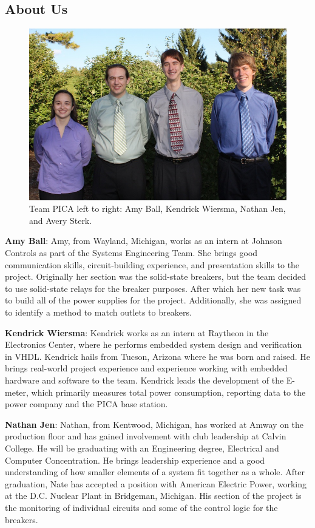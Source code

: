 \subsection{About Us}
\begin{figure}[htbp]
  \centering
  \includegraphics[width=6in]{includes/IMG_0865}
  \caption{Team PICA left to right: Amy Ball, Kendrick Wiersma, Nathan Jen, and Avery Sterk.}
  \label{fig:team_picture}
\end{figure}
\textbf{Amy Ball}: Amy, from Wayland, Michigan, works as an intern at Johnson Controls as part of the Systems Engineering Team. She brings good communication skills, circuit-building experience, and presentation skills to the project. Originally her section was the solid-state breakers, but the team decided to use solid-state relays for the breaker purposes. After which her new task was to build all of the power supplies for the project. Additionally, she was assigned to identify a method to match outlets to breakers.


\textbf{Kendrick Wiersma}: Kendrick works as an intern at Raytheon in the Electronics Center, where he performs embedded system design and verification in \ac{VHDL}. Kendrick hails from Tucson, Arizona where he was born and raised. He brings real-world project experience and experience working with embedded hardware and software to the team. Kendrick leads the development of the E-meter, which primarily measures total power consumption, reporting data to the power company and the PICA base station.


\textbf{Nathan Jen}: Nathan, from Kentwood, Michigan, has worked at Amway on the production floor and has gained involvement with club leadership at Calvin College. He will be graduating with an Engineering degree, Electrical and Computer Concentration. He brings leadership experience and a good understanding of how smaller elements of a system fit together as a whole. After graduation, Nate has accepted a position with American Electric Power, working at the D.C. Nuclear Plant in Bridgeman, Michigan. His section of the project is the monitoring of individual circuits and some of the control logic for the breakers. 


